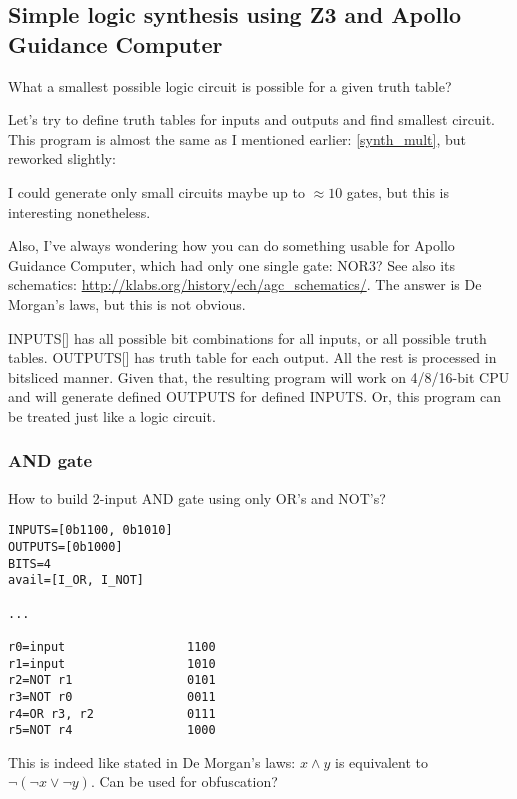 \subsection{Simple logic synthesis using Z3 and Apollo Guidance Computer}

\renewcommand{\CURPATH}{synth/logic/simple_and_Apollo}

What a smallest possible logic circuit is possible for a given truth table?

Let's try to define truth tables for inputs and outputs and find smallest circuit.
This program is almost the same as I mentioned earlier: \ref{synth_mult}, but reworked slightly:



I could generate only small circuits maybe up to $\approx 10$ gates, but this is interesting nonetheless.

Also, I've always wondering how you can do something usable for Apollo Guidance Computer,
which had only one single gate: NOR3?
See also its schematics: \url{http://klabs.org/history/ech/agc_schematics/}.
The answer is De Morgan's laws, but this is not obvious.

INPUTS[] has all possible bit combinations for all inputs, or all possible truth tables. OUTPUTS[] has truth table for each output.
All the rest is processed in bitsliced manner.
Given that, the resulting program will work on 4/8/16-bit CPU and will generate defined OUTPUTS for defined INPUTS.
Or, this program can be treated just like a logic circuit.

\subsubsection{AND gate}

How to build 2-input AND gate using only OR's and NOT's?

\begin{lstlisting}
INPUTS=[0b1100, 0b1010]
OUTPUTS=[0b1000]
BITS=4
avail=[I_OR, I_NOT]

...

r0=input                 1100
r1=input                 1010
r2=NOT r1                0101
r3=NOT r0                0011
r4=OR r3, r2             0111
r5=NOT r4                1000
\end{lstlisting}

This is indeed like stated in De Morgan's laws: $x \wedge y$ is equivalent to $\neg (\neg x \vee \neg y)$.
Can be used for obfuscation?

